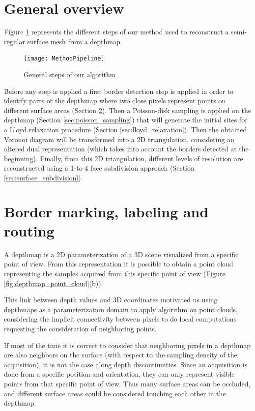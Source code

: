 \documentclass[11pt,fleqn]{book} %
\begin{document}
\section{General overview}
\label{sec:general_overview}

Figure \ref{fig:general_steps} represents the different steps of our method used to reconstruct a semi-regular surface mesh from a depthmap.

\begin{figure}[ht]
\centering\texttt{[image: MethodPipeline]}
\caption{General steps of our algorithm}
\label{fig:general_steps}
\end{figure}

Before any step is applied a first border detection step is applied in order to identify parts ot the depthmap where two close pixels represent points on different surface areas (Section \ref{sec:border_marking}). Then a Poisson-disk sampling is applied on the depthmap (Section \ref{sec:poisson_sampling}) that will generate the initial sites for a Lloyd relaxation procedure (Section \ref{sec:lloyd_relaxation}). Then the obtained Voronoi diagram will be transformed into a 2D triangulation, considering an altered dual representation (which takes into account the borders detected at the beginning). Finally, from this 2D triangulation, different levels of resolution are reconstructed using a 1-to-4 face subdivision approach (Section \ref{sec:surface_subdivision}).

\section{Border marking, labeling and routing}
\label{sec:border_marking}

A depthmap is a 2D parameterization of a 3D scene visualized from a specific point of view. From this representation it is possible to obtain a point cloud representing the samples acquired from this specific point of view (Figure \ref{fig:depthmap_point_cloud}(b)).

This link between depth values and 3D coordinates motivated us using depthmaps as a parameterization domain to apply algorithm on point clouds, considering the implicit connectivity between pixels to do local computations requesting the consideration of neighboring points.

If most of the time it is correct to consider that neighboring pixels in a depthmap are also neighbors on the surface (with respect to the sampling density of the acquisition), it is not the case along depth discontinuities.
Since an acquisition is done from a specific position and orientation, they can only represent visible points from that specific point of view. 
Thus many surface areas can be occluded, and different surface areas could be considered touching each other in the depthmap.
\end{document}
